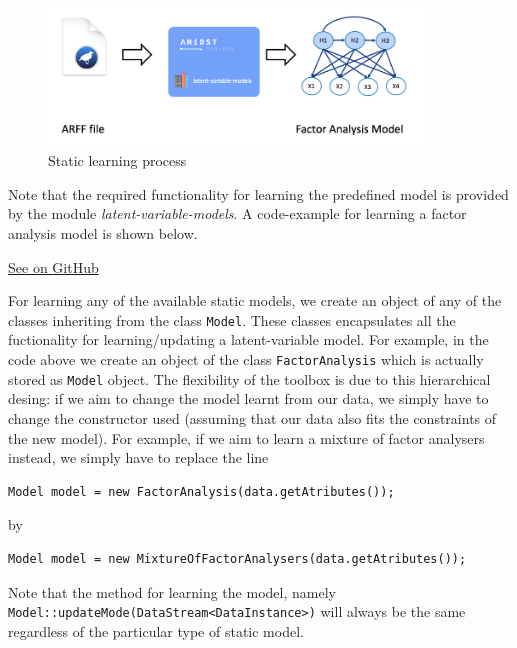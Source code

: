 \documentclass[10pt,a4paper]{article}
\begin{document}
\begin{figure}[h!]
	\centering
	\includegraphics[width=10cm]{img/staticlearning.png}
	\caption{Static learning process}
	\label{fig:lvmodels:static:learning:scheme}	
\end{figure}


Note that the required functionality for learning the predefined model is provided by the module \textit{latent-variable-models}. A code-example for learning a factor analysis model is shown below.



\href{https://github.com/amidst/tutorial/blob/master/src/main/java/eu/amidst/tutorial/usingAmidst/examples/StaticModelLearning.java}{See on GitHub}
\vspace{3mm}


For learning any of the available static models, we create an object of any of the classes inheriting from the class \texttt{Model}. These classes encapsulates all the fuctionality for learning/updating a latent-variable model. For example, in the code above we create an object of the class \texttt{FactorAnalysis} which is actually stored as \texttt{Model} object. The flexibility of the toolbox is due to this hierarchical desing: if we aim to change the model learnt from our data, we simply have to change the constructor used (assuming that our data also fits the constraints of the new model). For example, if we aim to learn a mixture of factor analysers instead, we simply have to replace the line 

\begin{verbatim}
Model model = new FactorAnalysis(data.getAtributes());
\end{verbatim}

\noindent by

\begin{verbatim}
Model model = new MixtureOfFactorAnalysers(data.getAtributes());
\end{verbatim}

\noindent Note that the method for learning the model, namely \texttt{Model::updateMode(DataStream<DataInstance>)} will always be the same regardless of the particular type of static model.\newline 
\end{document}
